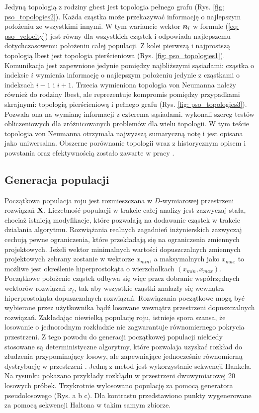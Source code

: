 Jedyną topologią z rodziny gbest jest topologia pełnego grafu (Rys. \ref{fig: pso_topologies2}). Każda cząstka może przekazywać informację o najlepszym położeniu ze wszystkimi innymi. W tym wariancie wektor $\bm{n}_i$ w formule (\ref{eq: pso_velocity}) jest równy dla wszystkich cząstek i odpowiada najlepszemu dotychczasowemu położeniu całej populacji. Z kolei pierwszą i najprostszą topologią lbest jest topologia pierścieniowa (Rys. \ref{fig: pso_topologies1}). Komunikacja jest zapewnione jedynie pomiędzy najbliższymi sąsiadami: cząstka o indeksie $i$ wymienia informację o najlepszym położeniu jedynie z cząstkami o indeksach $i-1$ i $i+1$. Trzecia wymieniona topologia von Neumanna należy również do rodziny lbest, ale reprezentuje kompromis pomiędzy przypadkami skrajnymi: topologią pierścieniową i pełnego grafu (Rys. \ref{fig: pso_topologies3}). Pozwala ona na wymianę informacji z czterema sąsiadami.\parencite{Kennedy2002} wykonali szereg testów obliczeniowych dla zróżnicowanych problemów dla wielu topologii. W tym teście topologia von Neumanna otrzymała najwyższą sumaryczną notę i jest opisana jako uniwersalna. Obszerne porównanie topologii wraz z historycznym opisem i powstania oraz efektywnością zostało zawarte w pracy \parencite{Blackwell2019}.

\subsection{Generacja populacji}
Początkowa populacja roju jest rozmieszczana w $D$-wymiarowej przestrzeni rozwiązań $\mathbf{X}$. Liczebność populacji w trakcie całej analizy jest zazwyczaj stała, chociaż istnieją modyfikacje, które pozwalają na dodawanie cząstek w trakcie działania algorytmu. Rozwiążania realnych zagadnień inżynierskich zazwyczaj cechują pewne ograniczenia, które przekładają się na ograniczenia zmiennych projektowych. Jeżeli wektor minimalnych wartości dopuszczalnych zmiennych projektowych zebrany zostanie w wektorze $x_{min}$, a  maksymalnych jako $x_{max}$ to możliwe jest określenie hiperprostokąta o wierzchołkach $(x_{min},x_{max})$. Początkowe położenie cząstek odbywa się więc przez dobranie współrzędnych wektorów rozwiązań $x_i$, tak aby wszystkie cząstki znalazły się wewnątrz hiperprostokąta dopuszczalnych rozwiązań. Rozwiązania początkowe mogą być wybierane przez użytkownika bądź losowane wewnątrz przestrzeni dopuszczalnych rozwiązań. Zakładając niewielką populację roju, istnieje spora szansa, że losowanie o jednorodnym rozkładzie nie zagwarantuje równomiernego pokrycia przestrzeni. Z tego powodu do generacji początkowej populacji niekiedy stosowane są deterministyczne algorytmy, które pozwalaja uzyskać rozkład do złudzenia przypominający losowy, ale zapewniające jednocześnie równomierną dystrybucję w przestrzeni \parencite{Saliby2002}. Jedną z metod jest wykorzystanie sekwencji Hankela. Na rysunku pokazano przykłady rozkłądu w przestrzeni dwuwymiarowej 20 losowych próbek. Trzykrotnie wylosowano populację za pomocą generatora pseudolosowego (Rys. a b c). Dla kontrastu przedstawiono punkty wygenerowane za pomocą sekwencji Haltona w takim samym zbiorze. 

